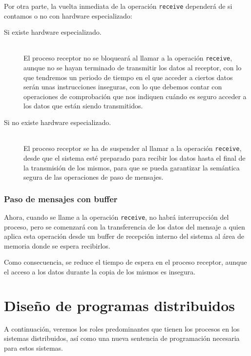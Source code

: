 Por otra parte, la vuelta inmediata de la operación \verb|receive| dependerá de si contamos o no con hardware especializado:
\begin{description}
    \item [Si existe hardware especializado.]~\\
        El proceso receptor no se bloqueará al llamar a la operación \verb|receive|, aunque no se hayan terminado de transmitir los datos al receptor, con lo que tendremos un periodo de tiempo en el que acceder a ciertos datos serán unas instrucciones inseguras, con lo que debemos contar con operaciones de comprobación que nos indiquen cuándo es seguro acceder a los datos que están siendo transmitidos.
    \item [Si no existe hardware especializado.]~\\
        El proceso receptor se ha de suspender al llamar a la operación \verb|receive|, desde que el sistema esté preparado para recibir los datos hasta el final de la transmisión de los mismos, para que se pueda garantizar la semántica segura de las operaciones de paso de mensajes.
\end{description}

\subsubsection{Paso de mensajes con buffer}
Ahora, cuando se llame a la operación \verb|receive|, no habrá interrupcción del proceso, pero se comenzará con la transferencia de los datos del mensaje a quien aplica esta operación desde un buffer de recepción interno del sistema al área de memoria donde se espera recibirlos.

Como consecuencia, se reduce el tiempo de espera en el proceso receptor, aunque el acceso a los datos durante la copia de los mismos es insegura.

\section{Diseño de programas distribuidos}
A continuación, veremos los roles predominantes que tienen los procesos en los sistemas distribuidos, así como una nueva sentencia de programación necesaria para estos sistemas.

